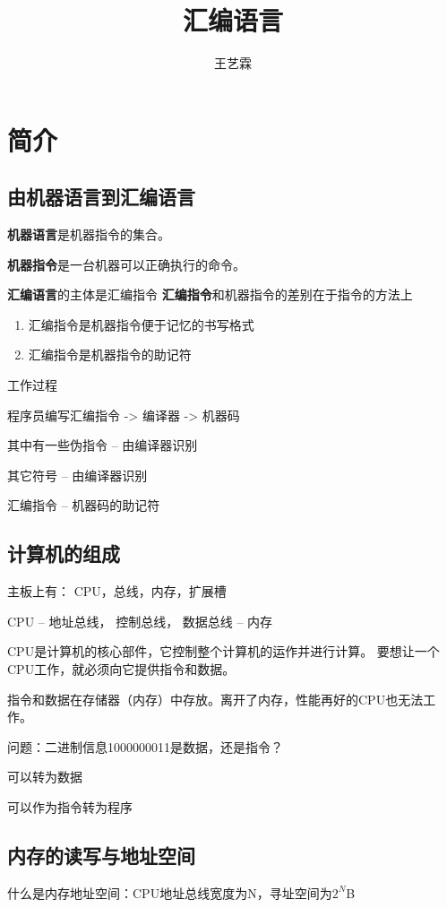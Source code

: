 \documentclass[12pt]{ctexart}
\begin{document}
    \title{汇编语言}
    \author{王艺霖}
    \maketitle
\section{简介}
\subsection{由机器语言到汇编语言}
\textbf{机器语言}是机器指令的集合。

\textbf{机器指令}是一台机器可以正确执行的命令。

\textbf{汇编语言}的主体是汇编指令
\textbf{汇编指令}和机器指令的差别在于指令的方法上

\begin{enumerate}
    \item 汇编指令是机器指令便于记忆的书写格式
    \item 汇编指令是机器指令的助记符
\end{enumerate}

工作过程

程序员编写汇编指令 ->  编译器 -> 机器码

其中有一些伪指令  -- 由编译器识别

其它符号 -- 由编译器识别

汇编指令 -- 机器码的助记符

\subsection{计算机的组成}
主板上有： CPU，总线，内存，扩展槽

CPU -- 地址总线， 控制总线， 数据总线 -- 内存

CPU是计算机的核心部件，它控制整个计算机的运作并进行计算。
要想让一个CPU工作，就必须向它提供指令和数据。

指令和数据在存储器（内存）中存放。离开了内存，性能再好的CPU也无法工作。

问题：二进制信息1000000011是数据，还是指令？

可以转为数据

可以作为指令转为程序

\subsection{内存的读写与地址空间}
什么是内存地址空间：CPU地址总线宽度为N，寻址空间为$2^N$B
\end{document}

